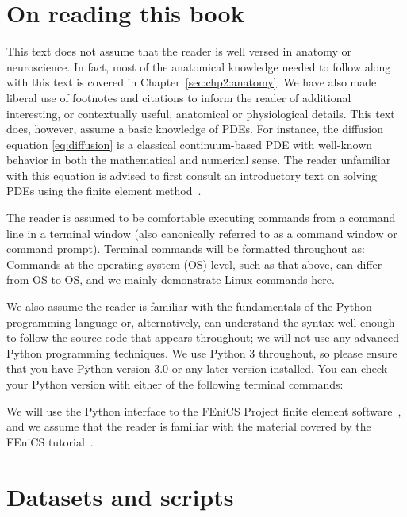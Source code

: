 \section{On reading this book}
This text does not assume that the reader is well versed in anatomy or
neuroscience.  In fact, most of the anatomical knowledge needed to
follow along with this text is covered in
Chapter~\ref{sec:chp2:anatomy}.  We have also made liberal use of
footnotes and citations to inform the reader of additional
interesting, or contextually useful, anatomical or physiological
details. This text does, however, assume a basic knowledge of
PDEs. For instance, the diffusion equation \eqref{eq:diffusion} is a
classical continuum-based PDE with well-known behavior in both the
mathematical and numerical sense. The reader unfamiliar with this
equation is advised to first consult an introductory text on solving
PDEs using the finite element
method~\cite{gockenbach2006understanding, langtangen2016solving,
  langtangen2019introduction,tveito2004introduction}.

The reader is assumed to be comfortable executing commands from a
command line in a terminal window (also canonically referred
to as a command window or command prompt). Terminal commands
will be formatted throughout as:
\noindent Commands at the operating-system (OS) level, such as that above,
can differ from OS to OS, and we mainly demonstrate Linux commands
here.

We also assume the reader is familiar with the fundamentals of the
Python programming language or, alternatively, can understand the
syntax well enough to follow the source code that appears throughout;
we will not use any advanced Python programming techniques. We use
Python 3 throughout, so please ensure that you have Python version 3.0
or any later version installed. You can check your Python version with
either of the following terminal commands:

We will use the Python interface to the FEniCS Project finite
element software~\cite{alnaes2015fenics}, and we assume that the
reader is familiar with the material covered by the FEniCS
tutorial~\cite{langtangen2016solving}.

\section{Datasets and scripts}

